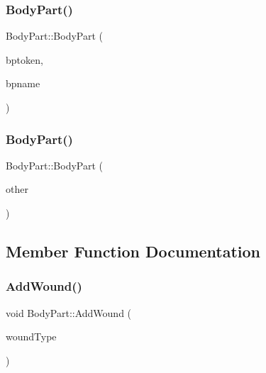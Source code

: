 \mbox{\label{class_body_part_ac09038a5c7837d63f5f2b97747a88854}} 
\subsubsection{\texorpdfstring{Body\+Part()}{BodyPart()}\hspace{0.1cm}{\footnotesize\ttfamily [3/4]}}
{\footnotesize\ttfamily Body\+Part\+::\+Body\+Part (\begin{DoxyParamCaption}\item[{std\+::string}]{bptoken,  }\item[{std\+::string}]{bpname }\end{DoxyParamCaption})}

\mbox{\label{class_body_part_a605504c8f1ce6c8977c409c052b82633}} 
\subsubsection{\texorpdfstring{Body\+Part()}{BodyPart()}\hspace{0.1cm}{\footnotesize\ttfamily [4/4]}}
{\footnotesize\ttfamily Body\+Part\+::\+Body\+Part (\begin{DoxyParamCaption}\item[{const \mbox{\hyperlink{class_body_part}{Body\+Part}} \&}]{other }\end{DoxyParamCaption})}



\subsection{Member Function Documentation}
\mbox{\label{class_body_part_a796eab925725be8a3bba686958677789}} 
\subsubsection{\texorpdfstring{Add\+Wound()}{AddWound()}}
{\footnotesize\ttfamily void Body\+Part\+::\+Add\+Wound (\begin{DoxyParamCaption}\item[{\mbox{\hyperlink{_enum_types_8hpp_a585daaeecd1f9f1350c24bf0081a734e}{Wound\+Type}}}]{wound\+Type }\end{DoxyParamCaption})}

